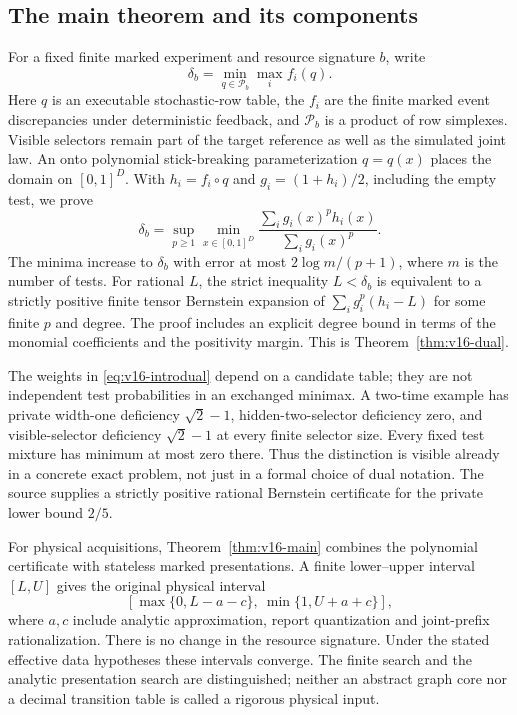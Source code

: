 \subsection{The main theorem and its components}
For a fixed finite marked experiment and resource signature $b$, write
\[
 \delta_b=\min_{q\in\mathcal P_b}\max_i f_i(q).
\]
Here $q$ is an executable stochastic-row table, the $f_i$ are the
finite marked event discrepancies under deterministic feedback, and
$\mathcal P_b$ is a product of row simplexes. Visible selectors remain
part of the target reference as well as the simulated joint law.
An onto polynomial stick-breaking parameterization $q=q(x)$ places
the domain on $[0,1]^D$. With $h_i=f_i\circ q$ and $g_i=(1+h_i)/2$,
including the empty test, we prove
\begin{equation}\label{eq:v16-introdual}
 \delta_b=\sup_{p\ge1}\min_{x\in[0,1]^D}
       \frac{\sum_i g_i(x)^p h_i(x)}{\sum_i g_i(x)^p}.
\end{equation}
The minima increase to $\delta_b$ with error at most
$2\log m/(p+1)$, where $m$ is the number of tests. For rational $L$,
the strict inequality $L<\delta_b$ is equivalent to a strictly positive
finite tensor Bernstein expansion of
$\sum_i g_i^p(h_i-L)$ for some finite $p$ and degree. The proof includes
an explicit degree bound in terms of the monomial coefficients and the
positivity margin. This is Theorem~\ref{thm:v16-dual}.

The weights in \eqref{eq:v16-introdual} depend on a candidate table;
they are not independent test probabilities in an exchanged minimax.
A two-time example has private width-one deficiency $\sqrt2-1$,
hidden-two-selector deficiency zero, and visible-selector deficiency
$\sqrt2-1$ at every finite selector size. Every fixed test mixture has
minimum at most zero there. Thus the distinction is visible already
in a concrete exact problem, not just in a formal choice of dual
notation. The source supplies a strictly positive rational Bernstein
certificate for the private lower bound $2/5$.

For physical acquisitions, Theorem~\ref{thm:v16-main} combines the
polynomial certificate with stateless marked presentations. A finite
lower--upper interval $[L,U]$ gives the original physical interval
\[
 [\max\{0,L-a-c\},\ \min\{1,U+a+c\}],
\]
where $a,c$ include analytic approximation, report quantization and
joint-prefix rationalization. There is no change in the resource
signature. Under the stated effective data hypotheses these intervals
converge. The finite search and the analytic presentation search are
distinguished; neither an abstract graph core nor a decimal transition
table is called a rigorous physical input.

